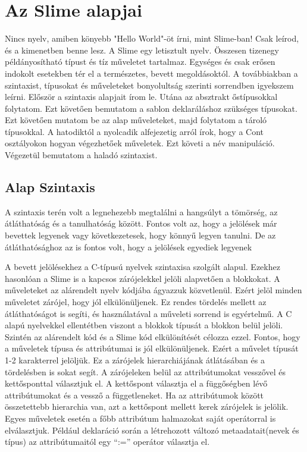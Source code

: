 \section{Az Slime alapjai}
Nincs nyelv, amiben könyebb "Hello World"-öt írni, mint Slime-ban!
Csak leírod, és a kimenetben benne lesz.
A Slime egy letisztult nyelv. 
Összesen tizenegy példányosítható típust és tíz műveletet tartalmaz. 
Egységes és csak erősen indokolt esetekben tér el a természetes, bevett megoldásoktól.
A továbbiakban a szintaxist, típusokat és műveleteket bonyolultság szerinti sorrendben igyekszem leírni.
Először a szintaxis alapjait írom le.
Utána az absztrakt őstípusokkal folytatom.
Ezt követően bemutatom a sablon deklaráláshoz szükséges típusokat.
Ezt követően mutatom be az alap műveleteket,
majd folytatom a tároló típusokkal.
A hatodiktól a nyolcadik alfejezetig arról írok, hogy a Cont osztályokon hogyan végezhetőek műveletek.
Ezt követi a név manipuláció.
Végezetül bemutatom a haladó szintaxist.

  

\subsection{Alap Szintaxis}
A szintaxis terén volt a legnehezebb megtalálni a hangsúlyt a tömörség, az átláthatóság és a tanulhatóság között. 
Fontos volt az, hogy a jelölések már bevettek legyenek vagy következetesek, hogy könnyű legyen tanulni. 
De az átláthatósághoz az is fontos volt, hogy a jelölések egyediek legyenek

A bevett jelölésekhez a C-típusú nyelvek szintaxisa szolgált alapul.
Ezekhez hasonlóan a Slime is a kapcsos zárójelekkel jelöli alapvetően a blokkokat. 
A műveleteket az alárendelt nyelv kódjába ágyazzuk közvetlenül.
Ezért jelöl minden műveletet zárójel, hogy jól elkülönüljenek. 
Ez rendes tördelés mellett az átláthatóságot is segíti, és használatával a műveleti sorrend is egyértelmű. 
A C alapú nyelvekkel ellentétben viszont a blokkok típusát a blokkon belül jelöli. 
Szintén az alárendelt kód és a Slime kód elkülönítését célozza ezzel.
Fontos, hogy a műveletek típusa és attribútumai is jól elkülönüljenek.
Ezért a művelet típusát 1-2 karakterrel jelöljük.
Ez a zárójelek hierarchiájának átlátásában és a tördelésben is sokat segít. 
A zárójeleken belül az attribútumokat vesszővel és kettősponttal választjuk el. 
A kettőspont választja el a függőségben lévő attribútumokat és a vessző a függetleneket. 
Ha az attribútumok között összetettebb hierarchia van, azt a kettőspont mellett kerek zárójelek is jelölik. 
Egyes műveletek esetén a főbb attribútum halmazokat saját operátorral is elválasztjuk. 
Például deklaráció során a létrehozott változó metaadatait(nevek és típus) az attribútumaitól egy “:=” operátor választja el.

